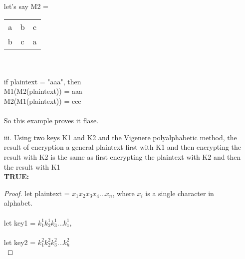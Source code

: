 \documentclass[12pt,letterpaper]{article}
\begin{document}
\begin{enumerate}
        let's say M2 = 
        \begin{tabular}{ c c c }
         a & b & c \\ 
         b & c & a \\  
        \end{tabular}\\\\
        if plaintext = "aaa", then\\
        M1(M2(plaintext)) = aaa 
        \\
        M2(M1(plaintext)) = ccc\\\\
        So this example proves it flase.
        
        \item[iii.]
        Using two keys K1 and K2 and the Vigenere polyalphabetic method, the result of encryption a general plaintext first with K1 and then encrypting the result with K2 is the same as first encrypting the plaintext with K2 and then the result with K1\\
        
        \textbf{TRUE:}
        \begin{proof} let plaintext = $x_1 x_2 x_3 x_4 ... x_n$, where $x_i$ is a single character in alphabet. 
        \\
        \\
        let key1 = $k^1_1 k^1_2 k^1_3 ... k^1_z$,\\\\
        let key2 = $k^2_1 k^2_2 k^2_3 ... k^2_h$ \\
        

\end{proof}
\end{enumerate}
\end{document}
